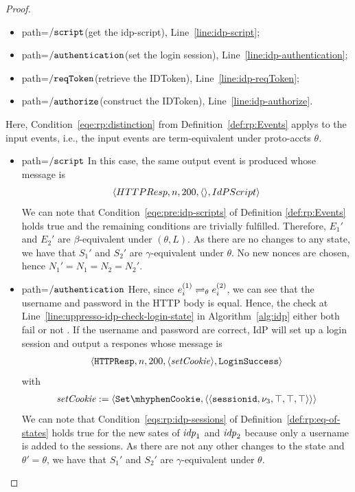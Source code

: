 \begin{theorem}
\begin{proof}
    \begin{itemize}
      \item path=$\mathtt{/script}$(get the idp-script), Line~\ref{line:idp-script};
      \item path=$\mathtt{/authentication}$(set the login session), Line~\ref{line:idp-authentication};
      \item path=$\mathtt{/reqToken}$(retrieve the IDToken), Line~\ref{line:idp-reqToken};
      \item path=$\mathtt{/authorize}$(construct the IDToken), Line~\ref{line:idp-authorize}.
    \end{itemize}

    Here, Condition~\ref{eqe:rp:distinction} from Definition~\ref{def:rp:Events} applys to the input events,
    i.e., the input events are term-equivalent under proto-accts $\theta$. 
    \begin{itemize}
      \item path=$\mathtt{/script}$ 
        In this case, the same output event is produced whose message is 
        \begin{equation}
          \begin{aligned}
            \langle {{}HTTPResp,n,200,\langle {{}} \rangle,IdPScript} \rangle
          \end{aligned}
        \end{equation}
        We can note that Condition~\ref{eqe:pre:idp-scripts} of Definition \ref{def:rp:Events} holds true and the remaining conditions are trivially fulfilled.
        Therefore, $E_1\prime$ and $E_2\prime$ are $\beta$-equivalent under $(\theta, L)$. 
        As there are no changes to any state, we have that $S_1\prime$ and $S_2\prime$ are $\gamma$-equivalent under $\theta$. 
        No new nonces are chosen, hence $N_1\prime=N_1=N_2=N_2\prime$.
      \item path=$\mathtt{/authentication}$ 
        Here, since $e_i^{(1)} \rightleftharpoons_{\theta} e_i^{(2)}$, we can see that the username and password in the HTTP body is equal. 
        Hence, the check at Line~\ref{line:uppresso-idp-check-login-state} in Algorithm~\ref{alg:idp} either both fail or not . 
        If the username and password are correct, IdP will set up a login session and output a respones whose message is 
        \begin{align*}
          \langle {{}\mathtt{HTTPResp},n,200,\langle\mathit{setCookie}\rangle,\mathtt{LoginSuccess}} \rangle
        \end{align*}
        with
        \begin{align*}
          \mi{setCookie} := \myangle{\cSetCookie, \myangle{\myangle{\str{sessionid}, \nu_3, \True, \True, \True}}} \\
        \end{align*}
        We can note that Condition~\ref{eqs:rp:idp-sessions} of Definition~\ref{def:rp:eq-of-states} holds true for the new sates of $\mathit{idp}_1$ and $\mathit{idp}_2$ because only a username is added to the sessions.
        As there are not any other changes to the state and $\theta\prime = \theta$, we have that $S_1\prime$ and $S_2\prime$ are $\gamma$-equivalent under $\theta$. 
        

\end{itemize}
\end{proof}
\end{theorem}
